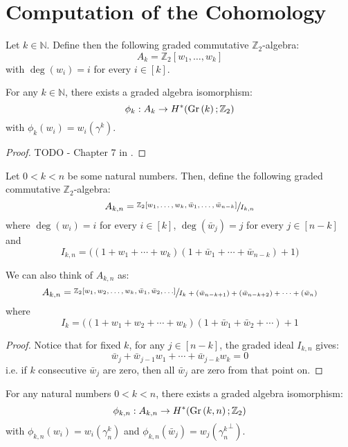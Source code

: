 \section{Computation of the Cohomology}


\begin{definition} Let $k\in\mathbb{N}$. Define then the following graded commutative $\mathbb{Z}_2$-algebra:
\[A_k=\mathbb{Z}_2[w_1,\ldots,w_k]\]
with $\deg(w_i)=i$ for every $i\in[k]$.
\end{definition}
\begin{theorem} For any $k\in\mathbb{N}$, there exists a graded algebra isomorphism:
\[\phi_k:A_k\to H^*(\Gr{k};\mathbb{Z}_2)\]
with $\phi_k(w_i)=w_i(\gamma^k)$.
\end{theorem}
\begin{proof} TODO - Chapter 7 in \cite{char_class}.
\end{proof}
\begin{definition} Let $0<k<n$ be some natural numbers. Then, define the following graded commutative $\mathbb{Z}_2$-algebra:
\[A_{k,n}=\sfrac{\mathbb{Z}_2[w_1,\ldots,w_k,\bar{w}_1,\ldots,\bar{w}_{n-k}]}{I_{k,n}}\]
where $\deg(w_i)=i$ for every $i\in[k]$, $\deg(\bar{w}_j)=j$ for every $j\in[n-k]$ and
\[I_{k,n}=\big((1+w_1+\cdots+w_k)(1+\bar{w}_1+\cdots+\bar{w}_{n-k})+1\big)\]
\end{definition}
\begin{proposition} We can also think of $A_{k,n}$ as:
\[A_{k,n}=\sfrac{\mathbb{Z}_2[w_1,w_2,\ldots,w_k,\bar{w}_1,\bar{w}_2,\ldots]}{I_k+(\bar{w}_{n-k+1})+(\bar{w}_{n-k+2})+\cdots+(\bar{w}_{n})}\]
where
\[I_k=\big((1+w_1+w_2+\cdots+w_k)(1+\bar{w}_1+\bar{w}_2+\cdots)+1\]
\end{proposition}
\begin{proof} Notice that for fixed $k$, for any $j\in[n-k]$, the graded ideal $I_{k,n}$ gives:
\[\bar{w}_j+\bar{w}_{j-1}w_1+\cdots+\bar{w}_{j-k}w_k=0\]
i.e. if $k$ consecutive $\bar{w}_j$ are zero, then all $\bar{w}_j$ are zero from that point on.
\end{proof}
\begin{theorem} For any natural numbers $0<k<n$, there exists a graded algebra isomorphism:
\[\phi_{k,n}:A_{k,n}\to H^*(\Gr{k}{n};\mathbb{Z}_2)\]
with $\phi_{k,n}(w_i)=w_i(\gamma^k_n)$ and $\phi_{k,n}(\bar{w}_j)=w_j({\gamma^k_n}^{\perp})$.
\end{theorem}
